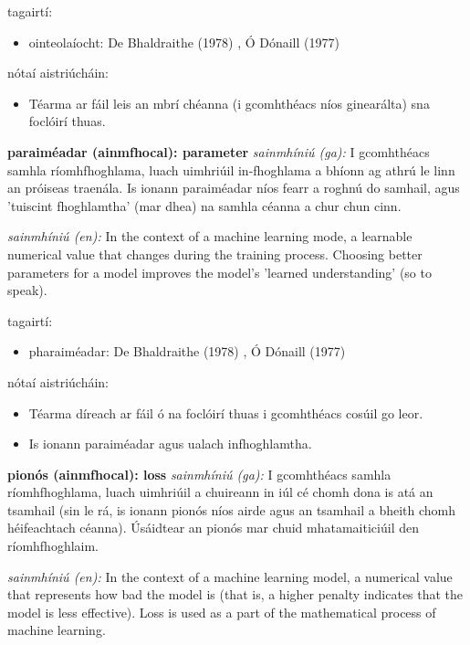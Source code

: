 \documentclass{article}
\begin{document}
tagairtí:
\begin{itemize}
	\item ointeolaíocht: De Bhaldraithe (1978) \cite{de-bhaldraithe}, Ó Dónaill (1977) \cite{odonaill}
\end{itemize}

nótaí aistriúcháin:
\begin{itemize}
	\item Téarma ar fáil leis an mbrí chéanna (i gcomhthéacs níos ginearálta) sna foclóirí thuas.
\end{itemize}


\textbf{paraiméadar (ainmfhocal): parameter}
\textit{sainmhíniú (ga):} I gcomhthéacs samhla ríomhfhoghlama, luach uimhriúil in-fhoghlama a bhíonn ag athrú le linn an próiseas traenála. Is ionann paraiméadar níos fearr a roghnú do samhail, agus 'tuiscint fhoghlamtha' (mar dhea) na samhla céanna a chur chun cinn.

\textit{sainmhíniú (en):} In the context of a machine learning mode, a learnable numerical value that changes during the training process. Choosing better parameters for a model improves the model's 'learned understanding' (so to speak).

tagairtí:
\begin{itemize}
	\item pharaiméadar: De Bhaldraithe (1978) \cite{de-bhaldraithe}, Ó Dónaill (1977) \cite{odonaill}
\end{itemize}

nótaí aistriúcháin:
\begin{itemize}
	\item Téarma díreach ar fáil ó na foclóirí thuas i gcomhthéacs cosúil go leor.
	\item Is ionann paraiméadar agus ualach infhoghlamtha.
\end{itemize}


\textbf{pionós (ainmfhocal): loss}
\textit{sainmhíniú (ga):} I gcomhthéacs samhla ríomhfhoghlama, luach uimhriúil a chuireann in iúl cé chomh dona is atá an tsamhail (sin le rá, is ionann pionós níos airde agus an tsamhail a bheith chomh héifeachtach céanna). Úsáidtear an pionós mar chuid mhatamaiticiúil den ríomhfhoghlaim.

\textit{sainmhíniú (en):} In the context of a machine learning model, a numerical value that represents how bad the model is (that is, a higher penalty indicates that the model is less effective). Loss is used as a part of the mathematical process of machine learning.
\end{document}
